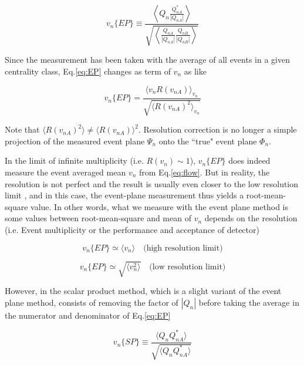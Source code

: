 	\begin{equation}
		v_n\{EP\} \equiv \frac{\left \langle Q_n \frac{Q_{nA}^*}{|Q_{nA}|} \right \rangle }{\sqrt{\left \langle  \frac{Q_{nA}}{|Q_{nA}|}  \frac{Q_{nB}}{|Q_{nB}|} \right \rangle }}
		\label{eq:EP}
	\end{equation}
	\smallskip
	
	Since the measurement has been taken with the average of all events in a given centrality class, Eq.\ref{eq:EP} changes as term of $v_n$ as like
	
	\begin{equation}
		v_n\{EP\} = \frac{\langle v_n R(v_{nA})\rangle _{v_n}}{\sqrt{\langle R(v_{nA})^2 \rangle _{v_n} }}
	\end{equation}
	\smallskip 
	
	Note that $\langle R(v_{nA})^2 \rangle \neq \langle R(v_{nA})\rangle ^2$. Resolution correction is no longer a simple projection of the measured event plane $\Psi_n$ onto the ``true" event plane $\Phi_n$.
	
	In the limit of infinite multiplicity (i.e. $R(v_n) \sim 1$), $v_n\{EP\}$ does indeed measure the event averaged mean $v_n$ from Eq.\ref{eq:flow}. But in reality, the resolution is not perfect and the result is usually even closer to the low resolution limit \cite{Alver:2008zza}, and in this case, the event-plane measurement thus yields a root-mean-square value. In other words, what we measure with the event plane method is some values between root-mean-square and mean of $v_n$ depends on the resolution (i.e. Event multiplicity or the performance and acceptance of detector)
	
	\begin{equation}
		v_n\{EP\} \simeq \langle v_n \rangle \quad \text{(high resolution limit)}
	\end{equation}

	\begin{equation}
		v_n\{EP\} \simeq \sqrt{\langle v_n^2 \rangle}  \quad \text{(low resolution limit)}
	\end{equation}
	\smallskip
	
	However, in the scalar product method, which is a slight variant of the event plane method, consists of removing the factor of $|Q_n|$ before taking the average in the numerator and denominator of Eq.\ref{eq:EP}
	
	
	\begin{equation}
		v_n\{SP\} \equiv \frac{\langle Q_n Q_{nA}^*\rangle}{\sqrt{\langle Q_n Q_{nA}^*\rangle}}
	\end{equation}
	\smallskip 
	
